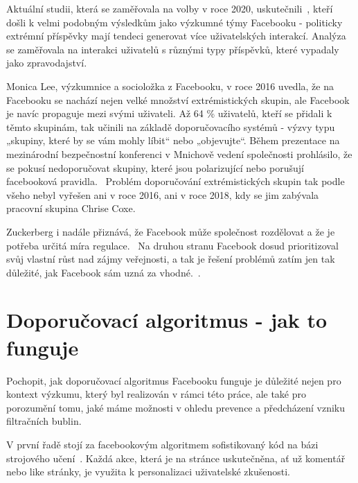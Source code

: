     Aktuální studii, která se zaměřovala na volby v roce 2020, uskutečnili~\cite{edelson_nguyen_goldstein_goga_lauinger_mccoy_2021}, kteří došli k velmi podobným výsledkům jako výzkumné týmy Facebooku - politicky extrémní příspěvky mají tendeci generovat více uživatelských interakcí. Analýza se zaměřovala na interakci uživatelů s různými typy příspěvků, které vypadaly jako zpravodajství. 
    
    Monica Lee, výzkumnice a socioložka z Facebooku, v roce 2016 uvedla, že na Facebooku se nachází nejen velké množství extrémistických skupin, ale Facebook je navíc propaguje mezi svými uživateli. Až 64 \% uživatelů, kteří se přidali k těmto skupinám, tak učinili na základě doporučovacího systémů - výzvy typu „skupiny, které by se vám mohly líbit“ nebo „objevujte“. Během prezentace na mezinárodní bezpečnostní konferenci v Mnichově vedení společnosti prohlásilo, že se pokusí nedoporučovat skupiny, které jsou polarizující nebo porušují facebooková pravidla.~\citep{horwitz_seetharaman_2020} Problém doporučování extrémistických skupin tak podle všeho nebyl vyřešen ani v roce 2016, ani v roce 2018, kdy se jim zabývala pracovní skupina Chrise Coxe. 
    
    Zuckerberg i nadále přiznává, že Facebook může společnost rozdělovat a že je potřeba určitá míra regulace.~\citep{marson_2020} Na druhou stranu Facebook dosud prioritizoval svůj vlastní růst nad zájmy veřejnosti, a tak je řešení problémů zatím jen tak důležité, jak Facebook sám uzná za vhodné.~\citep{hao_2021}.


\section{Doporučovací algoritmus - jak to funguje}
\label{chapter:doporucovaci-algoritmus-fungovani}
    Pochopit, jak doporučovací algoritmus Facebooku funguje je důležité nejen pro kontext výzkumu, který byl realizován v rámci této práce, ale také pro porozumění tomu, jaké máme možnosti v ohledu prevence a předcházení vzniku filtračních bublin.
    
    V první řadě stojí za facebookovým algoritmem sofistikovaný kód na bázi strojového učení~\citep{lada_wang_yan_2021}. Každá akce, která je na stránce uskutečněna, ať už komentář nebo like stránky, je využita k personalizaci uživatelské zkušenosti. ~\citep{satterfield_2020} 
    
